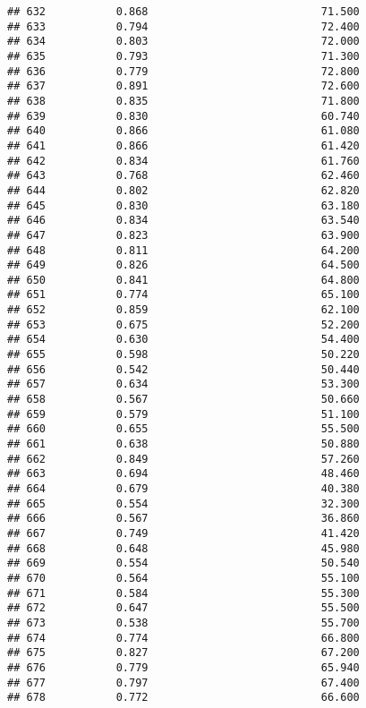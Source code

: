 \documentclass[
]{article}
\begin{document}
\begin{verbatim}
## 632           0.868                           71.500
## 633           0.794                           72.400
## 634           0.803                           72.000
## 635           0.793                           71.300
## 636           0.779                           72.800
## 637           0.891                           72.600
## 638           0.835                           71.800
## 639           0.830                           60.740
## 640           0.866                           61.080
## 641           0.866                           61.420
## 642           0.834                           61.760
## 643           0.768                           62.460
## 644           0.802                           62.820
## 645           0.830                           63.180
## 646           0.834                           63.540
## 647           0.823                           63.900
## 648           0.811                           64.200
## 649           0.826                           64.500
## 650           0.841                           64.800
## 651           0.774                           65.100
## 652           0.859                           62.100
## 653           0.675                           52.200
## 654           0.630                           54.400
## 655           0.598                           50.220
## 656           0.542                           50.440
## 657           0.634                           53.300
## 658           0.567                           50.660
## 659           0.579                           51.100
## 660           0.655                           55.500
## 661           0.638                           50.880
## 662           0.849                           57.260
## 663           0.694                           48.460
## 664           0.679                           40.380
## 665           0.554                           32.300
## 666           0.567                           36.860
## 667           0.749                           41.420
## 668           0.648                           45.980
## 669           0.554                           50.540
## 670           0.564                           55.100
## 671           0.584                           55.300
## 672           0.647                           55.500
## 673           0.538                           55.700
## 674           0.774                           66.800
## 675           0.827                           67.200
## 676           0.779                           65.940
## 677           0.797                           67.400
## 678           0.772                           66.600

\end{verbatim}
\end{document}
